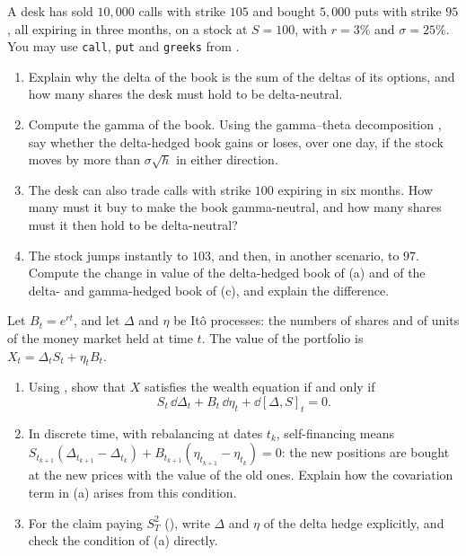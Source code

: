 \begin{exercise}\label{ex:dh-book}
\easy A desk has sold $10{,}000$ calls with strike $105$ and bought $5{,}000$ puts with strike
$95$, all expiring in three months, on a stock at $S=100$, with $r=3\%$ and $\sigma=25\%$. You may
use \texttt{call}, \texttt{put} and \texttt{greeks} from
.
\begin{enumerate}[label=(\alph*)]
  \item Explain why the delta of the book is the sum of the deltas of its options, and how many
    shares the desk must hold to be delta-neutral.
  \item Compute the gamma of the book. Using the gamma--theta decomposition
    , say whether the delta-hedged book gains or loses, over one
    day, if the stock moves by more than $\sigma\sqrt h$ in either direction.
  \item The desk can also trade calls with strike $100$ expiring in six months. How many must it
    buy to make the book gamma-neutral, and how many shares must it then hold to be
    delta-neutral?
  \item The stock jumps instantly to $103$, and then, in another scenario, to $97$. Compute the
    change in value of the delta-hedged book of (a) and of the delta- and gamma-hedged book of
    (c), and explain the difference.
\end{enumerate}
\end{exercise}

\begin{exercise}\label{ex:dh-holdings}
\medium Let $B_t=e^{rt}$, and let $\Delta$ and $\eta$ be It\^o processes: the numbers of shares
and of units of the money market held at time $t$. The value of the portfolio is
$X_t=\Delta_tS_t+\eta_tB_t$.
\begin{enumerate}[label=(\alph*)]
  \item Using , show that $X$ satisfies the wealth equation
     if and only if
    \[
      S_t\,\dd\Delta_t+B_t\,\dd\eta_t+\dd[\Delta,S]_t=0 .
    \]
  \item In discrete time, with rebalancing at dates $t_k$, self-financing means
    $S_{t_{k+1}}(\Delta_{t_{k+1}}-\Delta_{t_k})+B_{t_{k+1}}(\eta_{t_{k+1}}-\eta_{t_k})=0$: the new
    positions are bought at the new prices with the value of the old ones. Explain how the
    covariation term in (a) arises from this condition.
  \item For the claim paying $S_T^2$ (), write $\Delta$ and $\eta$ of the delta
    hedge explicitly, and check the condition of (a) directly.
\end{enumerate}
\end{exercise}

